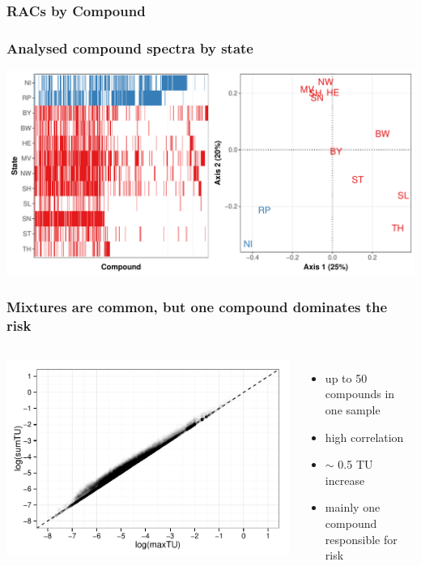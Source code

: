 \documentclass[
	10pt
	]{beamer}
\begin{document}
\begin{frame}
\frametitle{RACs by Compound}
	\begin{adjustbox}{max totalsize={\textwidth}{0.95\textheight}}
				
	\end{adjustbox}
\end{frame}


\begin{frame}
\frametitle{Analysed compound spectra by state}
	    	\includegraphics[width=\textwidth]{figs/spectra.pdf}
\end{frame}



\begin{frame}
\frametitle{Mixtures are common, but one compound dominates the risk}
	\begin{columns}
	    	\vspace{0.5cm}
	    	\includegraphics[width=\textwidth, keepaspectratio]{figs/tusum_tumax.pdf}
	        \begin{itemize}
	        	\item up to 50 compounds in one sample
	        	\item high correlation
	        	\item $\sim$ 0.5 TU increase 
	        	\item mainly one compound responsible for risk
	        \end{itemize}
	\end{columns}
\end{frame}
\end{document}
